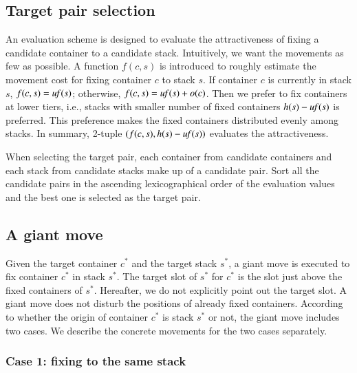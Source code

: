 \documentclass[review,3p,times,authoryear,12pt]{elsarticle}
\begin{document}
\subsection{Target pair selection}
\label{sec:tar}
An evaluation scheme is designed to evaluate the attractiveness of fixing a candidate container to a candidate stack. 
Intuitively, we want the movements as few as possible. A function $f(c,s)$ is introduced to roughly estimate the movement cost for fixing container $c$ to stack $s$. If container $c$ is currently in stack $s$, $f(c,s)=\id{uf}(s)$; otherwise, $f(c,s)=\id{uf}(s)+o(c)$. Then we prefer to fix containers at lower tiers, i.e., stacks with smaller number of fixed containers $h(s)-\id{uf}(s)$ is preferred. This preference makes the fixed containers distributed evenly among stacks. In summary, 2-tuple $(f(c,s), h(s)-\id{uf}(s))$ evaluates the attractiveness.

When selecting the target pair, each container from candidate containers and each stack from candidate stacks make up of a candidate pair. Sort all the candidate pairs in the ascending lexicographical order of the evaluation values and the best one is selected as the target pair.

\subsection{A giant move}

Given the target container $c^*$ and the target stack $s^*$, a giant move is executed to fix container $c^*$ in stack $s^*$. The target slot of $s^*$ for $c^*$ is the slot just above the fixed containers of $s^*$. Hereafter, we do not explicitly point out the target slot.
A giant move does not disturb the positions of already fixed containers. According to whether the origin of container $c^*$ is stack $s^*$ or not, the giant move includes two cases. We describe the concrete movements for the two cases separately.

\subsubsection{Case 1: fixing to the same stack}
\end{document}
